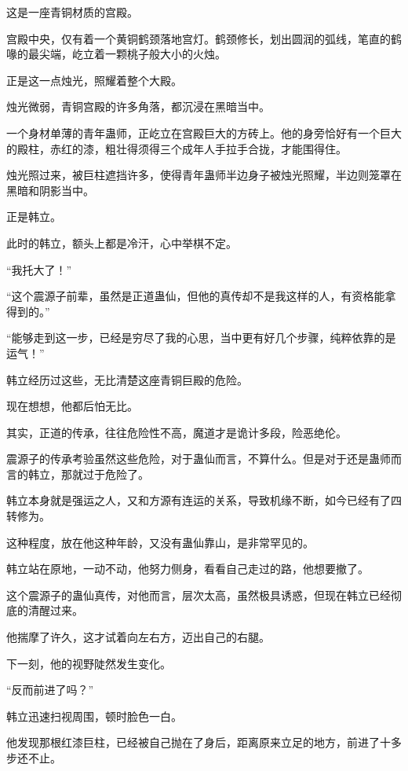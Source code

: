 
\begin{this_body}



这是一座青铜材质的宫殿。

宫殿中央，仅有着一个黄铜鹤颈落地宫灯。鹤颈修长，划出圆润的弧线，笔直的鹤喙的最尖端，屹立着一颗桃子般大小的火烛。

正是这一点烛光，照耀着整个大殿。

烛光微弱，青铜宫殿的许多角落，都沉浸在黑暗当中。

一个身材单薄的青年蛊师，正屹立在宫殿巨大的方砖上。他的身旁恰好有一个巨大的殿柱，赤红的漆，粗壮得须得三个成年人手拉手合拢，才能围得住。

烛光照过来，被巨柱遮挡许多，使得青年蛊师半边身子被烛光照耀，半边则笼罩在黑暗和阴影当中。

正是韩立。

此时的韩立，额头上都是冷汗，心中举棋不定。

“我托大了！”

“这个震源子前辈，虽然是正道蛊仙，但他的真传却不是我这样的人，有资格能拿得到的。”

“能够走到这一步，已经是穷尽了我的心思，当中更有好几个步骤，纯粹依靠的是运气！”

韩立经历过这些，无比清楚这座青铜巨殿的危险。

现在想想，他都后怕无比。

其实，正道的传承，往往危险性不高，魔道才是诡计多段，险恶绝伦。

震源子的传承考验虽然这些危险，对于蛊仙而言，不算什么。但是对于还是蛊师而言的韩立，那就过于危险了。

韩立本身就是强运之人，又和方源有连运的关系，导致机缘不断，如今已经有了四转修为。

这种程度，放在他这种年龄，又没有蛊仙靠山，是非常罕见的。

韩立站在原地，一动不动，他努力侧身，看看自己走过的路，他想要撤了。

这个震源子的蛊仙真传，对他而言，层次太高，虽然极具诱惑，但现在韩立已经彻底的清醒过来。

他揣摩了许久，这才试着向左右方，迈出自己的右腿。

下一刻，他的视野陡然发生变化。

“反而前进了吗？”

韩立迅速扫视周围，顿时脸色一白。

他发现那根红漆巨柱，已经被自己抛在了身后，距离原来立足的地方，前进了十多步还不止。


\end{this_body}
